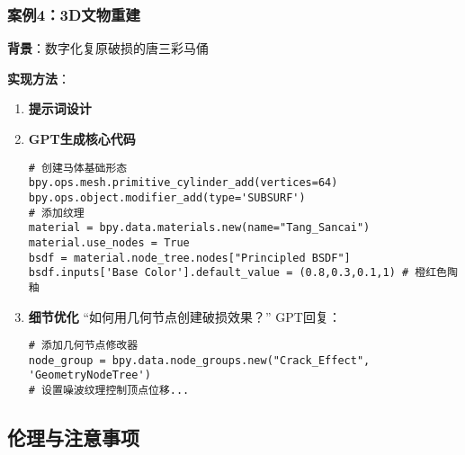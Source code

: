 \hypertarget{ux6848ux4f8b3ux5c06ux62cdux6444ux7684ux7167ux7247ux4feeux6539ux4e3aux52a8ux6f2bux98ceux683c}{%


\hypertarget{ux6848ux4f8b43dux6587ux7269ux91cdux5efa}{%
\subsubsection{案例4：3D文物重建}\label{ux6848ux4f8b43dux6587ux7269ux91cdux5efa}}

\textbf{背景}：数字化复原破损的唐三彩马俑

\textbf{实现方法}：

\begin{enumerate}
\def\labelenumi{\arabic{enumi}.}
\item
  \textbf{提示词设计} 
\item
  \textbf{GPT生成核心代码}

\begin{lstlisting}
# 创建马体基础形态
bpy.ops.mesh.primitive_cylinder_add(vertices=64)
bpy.ops.object.modifier_add(type='SUBSURF')
# 添加纹理
material = bpy.data.materials.new(name="Tang_Sancai")
material.use_nodes = True
bsdf = material.node_tree.nodes["Principled BSDF"]
bsdf.inputs['Base Color'].default_value = (0.8,0.3,0.1,1) # 橙红色陶釉
\end{lstlisting}
\item
  \textbf{细节优化} ``如何用几何节点创建破损效果？'' GPT回复：

\begin{lstlisting}
# 添加几何节点修改器
node_group = bpy.data.node_groups.new("Crack_Effect", 'GeometryNodeTree')
# 设置噪波纹理控制顶点位移...
\end{lstlisting}
\end{enumerate}



\hypertarget{ux4f26ux7406ux4e0eux6ce8ux610fux4e8bux9879}{%
\subsection{伦理与注意事项}\label{ux4f26ux7406ux4e0eux6ce8ux610fux4e8bux9879}}

}
